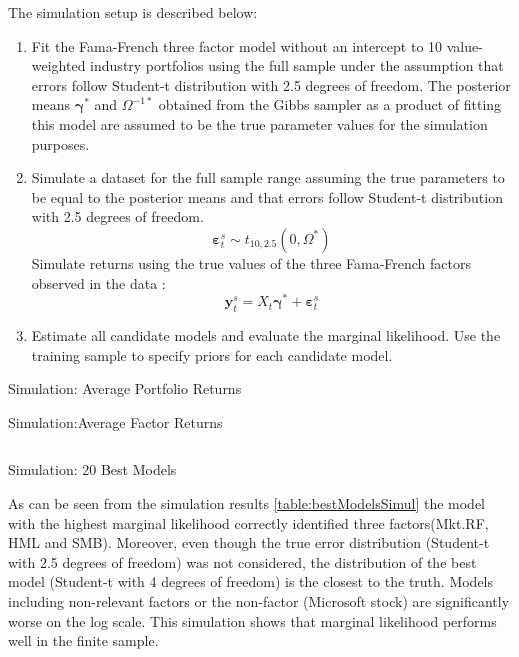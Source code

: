 The simulation setup is described below:
\begin{enumerate}
	\item Fit the Fama-French three factor model without an intercept to 10 value-weighted industry portfolios using the full sample under the assumption that errors follow Student-t distribution with 2.5 degrees of freedom. 
	The posterior means $\boldsymbol{\gamma}^*$ and $\Omega^{-1*}$ obtained from the Gibbs sampler as a product of fitting this model are assumed to be the true parameter values for the simulation purposes.
	\item Simulate a dataset for the full sample range assuming the true parameters  to be equal to the posterior means and that errors follow Student-t distribution with 2.5 degrees of freedom.
	\begin{equation*}
		\boldsymbol{\varepsilon}^s_{t}\sim t_{10,2.5 }\left( 0,\Omega^* \right)
	\end{equation*}
	Simulate returns using the true values of the three Fama-French factors observed in the data :
		\begin{equation*}
		\mathbf{y}_t^s = X_t \boldsymbol{\gamma}^* + \boldsymbol{\varepsilon}^s_t
		\end{equation*}

	\item Estimate all candidate models and evaluate the marginal likelihood.
	Use the training sample to specify priors for each candidate model.
\end{enumerate}

\begin{sidewaystable}[ht]
	\centering
	
	\label{table:avPortfolioReturnsSimul}	
	\caption{Simulation: Average Portfolio Returns}
	\bigskip\bigskip
	
	\caption{Simulation:Average Factor Returns}
	\label{table:avFactorReturnsSimul}	
\end{sidewaystable}


\begin{table}[ht]$  $
	\centering
	
	\caption{Simulation: 20 Best Models}
	\label{table:bestModelsSimul}
\end{table}

As can be seen from the simulation results \ref{table:bestModelsSimul} the model with the highest marginal likelihood correctly identified three factors(Mkt.RF, HML and SMB).
Moreover, even though the true error distribution (Student-t with 2.5 degrees of freedom) was not considered, the distribution of the best model (Student-t with 4 degrees of freedom) is the closest to the truth. 
Models including non-relevant factors or the non-factor (Microsoft stock) are significantly worse on the log scale.
This simulation shows that marginal likelihood performs well in the finite sample.
